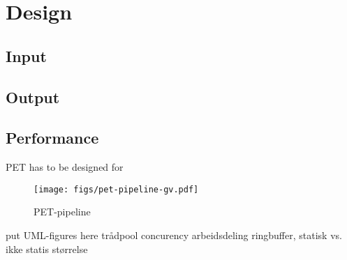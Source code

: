 \section{Design}

\subsection{Input}

\subsection{Output}

\subsection{Performance}

PET has to be designed for 

\begin{figure}
    \texttt{[image: figs/pet-pipeline-gv.pdf]}
    \caption{PET-pipeline}
    \label{fig:pipeline}
\end{figure}

put UML-figures here
trådpool
concurency
arbeidsdeling
ringbuffer, statisk vs. ikke statis størrelse


